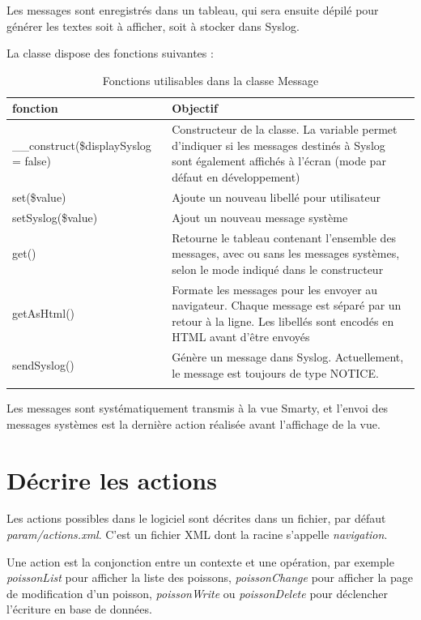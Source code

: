 Les messages sont enregistrés dans un tableau, qui sera ensuite dépilé pour générer les textes soit à afficher, soit à stocker dans Syslog.

La classe dispose des fonctions suivantes :
\begin{longtable}{|p{5cm}|p{8cm}|}
\hline
\textbf{fonction} & \textbf{Objectif} \\
\hline
\endhead
\_\_construct(\$displaySyslog = false) & Constructeur de la classe. La variable permet d'indiquer si les messages destinés à Syslog sont également affichés à l'écran (mode par défaut en développement) \\

set(\$value) & Ajoute un nouveau libellé pour utilisateur \\

setSyslog(\$value) & Ajout un nouveau message système \\

get() & Retourne le tableau contenant l'ensemble des messages, avec ou sans les messages systèmes, selon le mode indiqué dans le constructeur \\

getAsHtml() & Formate les messages pour les envoyer au navigateur. Chaque message est séparé par un retour à la ligne. Les libellés sont encodés en HTML avant d'être envoyés \\

sendSyslog() & Génère un message dans Syslog. Actuellement, le message est toujours de type NOTICE. \\
\hline

\caption{Fonctions utilisables dans la classe Message}
\end{longtable}

Les messages sont systématiquement transmis à la vue Smarty, et l'envoi des messages systèmes est la dernière action réalisée avant l'affichage de la vue.

\chapter{Décrire les actions}\label{labelxml}

Les actions possibles dans le logiciel sont décrites dans un fichier, par défaut \textit{param/actions.xml}. C'est un fichier XML dont la racine s'appelle \textit{navigation}. 

Une action est la conjonction entre un contexte et une opération, par exemple \textit{poissonList} pour afficher la liste des poissons, \textit{poissonChange} pour afficher la page de modification d'un poisson, \textit{poissonWrite} ou \textit{poissonDelete} pour déclencher l'écriture en base de données.


